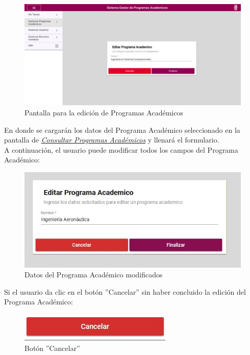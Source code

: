         \begin{figure}[H]
        	\centering
        	\hypertarget{editarpa}{\includegraphics[width=0.7\linewidth]{images/SP3/EditarPA}}
        	\caption{Pantalla para la edición de Programas Académicos}
        	\label{editarpa}
        \end{figure}

        En donde se cargarán los datos del Programa Académico seleccionado en la pantalla de \hyperlink{consultarpa}{\textit{Consultar Programas Académicos}} y llenará el formulario.\\

        A continuación, el usuario puede modificar todos los campos del Programa Académico:
        \begin{figure}[H]
        	\centering
        	\hypertarget{modif}{\includegraphics[width=0.7\linewidth]{images/SP3/Editado}}
        	\caption{Datos del Programa Académico modificados}
        	\label{modif}
        \end{figure}

        Si el usuario da clic en el botón ''Cancelar'' sin haber concluido la edición del Programa Académico:

        \begin{figure}[H]
        	\centering
        	\hypertarget{cancel2}{\includegraphics[width=0.7\linewidth]{images/SP3/BtnCancelar}}
        	\caption{Botón ''Cancelar''}
        	\label{cancel2}
        \end{figure}

